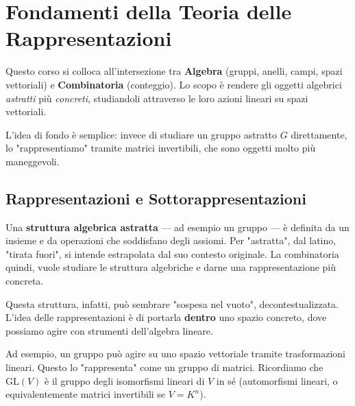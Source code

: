 % 
\chapter{Fondamenti della Teoria delle Rappresentazioni}
Questo corso si colloca all'intersezione tra \textbf{Algebra} (gruppi, anelli, campi, spazi vettoriali) e \textbf{Combinatoria} (conteggio). Lo scopo è rendere gli oggetti algebrici \textit{astratti} più \textit{concreti}, studiandoli attraverso le loro azioni lineari su spazi vettoriali.

L'idea di fondo è semplice: invece di studiare un gruppo astratto $G$ direttamente, lo "rappresentiamo" tramite matrici invertibili, che sono oggetti molto più maneggevoli.

\section{Rappresentazioni e Sottorappresentazioni}
Una \textbf{struttura algebrica astratta} — ad esempio un gruppo — è definita da un insieme e da operazioni che soddisfano degli assiomi.
%
Per "astratta", dal latino, "tirata fuori", si intende estrapolata dal suo contesto originale. La combinatoria quindi, vuole studiare le struttura algebriche e darne una rappresentazione più concreta.

Questa struttura, infatti, può sembrare "sospesa nel vuoto", decontestualizzata. L'idea delle rappresentazioni è di portarla \textbf{dentro} uno spazio concreto, dove possiamo agire con strumenti dell'algebra lineare.

Ad esempio, un gruppo può agire su uno spazio vettoriale tramite trasformazioni lineari. Questo lo "rappresenta" come un gruppo di matrici.
Ricordiamo che $\mathrm{GL}(V)$ è il gruppo degli isomorfismi lineari di $V$ in sé (automorfismi lineari, o equivalentemente matrici invertibili se $V = K^n$).


